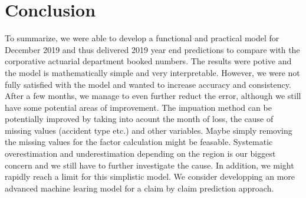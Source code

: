 \section{Conclusion}\label{Sect_Conclusion}
To summarize, we were able to develop a functional and practical model for December 2019 and thus delivered 2019 year end predictions to compare with the corporative actuarial department booked numbers. The results were potive and the model is mathematically simple and very interpretable. However, we were not fully satisfied with the model and wanted to increase accuracy and consistency. After a few months, we manage to even further reduct the error, although we still have some potential areas of improvement. The impuation method can be potentially improved by taking into acount the month of loss, the cause of missing values (accident type etc.) and other variables. Maybe simply removing the missing values for the factor calculation might be feasable. Systematic overestimation and underestimation depending on the region is our biggest concern and we still have to further investigate the cause. 
In addition, we might rapidly reach a limit for this simplistic model. We consider developping an more advanced machine learing model for a claim by claim prediction approach.